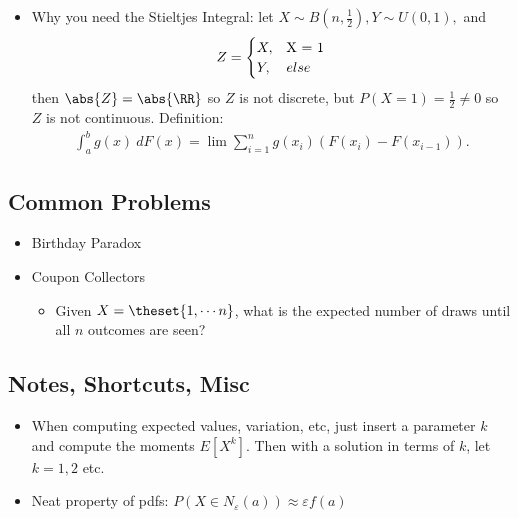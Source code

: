 \begin{itemize}
\tightlist
\item
  Why you need the Stieltjes Integral: let
  \(X \sim B(n, \frac 1 2), Y \sim U(0, 1),\) and
  \begin{align*}
  Z = 
  \begin{cases}
  X, & $X = 1$ \\
  Y, & else
  \end{cases}
  \end{align*} then \(\abs{Z} = \abs{\RR}\) so \(Z\) is not discrete,
  but \(P(X = 1) = \frac 1 2 \neq 0\) so \(Z\) is not continuous.
  Definition:
  \begin{align*}  
  \int _ { a } ^ { b } g ( x ) ~d F ( x ) = \lim \sum _ { i = 1 } ^ { n } g \left( x _ { i } \right) \left( F \left( x _ { i } \right) - F \left( x _ { i - 1 } \right) \right)
  .\end{align*}
\end{itemize}

\hypertarget{common-problems}{%
\subsection{Common Problems}\label{common-problems}}

\begin{itemize}
\tightlist
\item
  Birthday Paradox
\item
  Coupon Collectors

  \begin{itemize}
  \tightlist
  \item
    Given \(X = \theset{1, \cdots n}\), what is the expected number of
    draws until all \(n\) outcomes are seen?
  \end{itemize}
\end{itemize}

\hypertarget{notes-shortcuts-misc}{%
\subsection{Notes, Shortcuts, Misc}\label{notes-shortcuts-misc}}

\begin{itemize}
\tightlist
\item
  When computing expected values, variation, etc, just insert a
  parameter \(k\) and compute the moments \(E[X^k]\). Then with a
  solution in terms of \(k\), let \(k=1,2\) etc.
\item
  Neat property of pdfs:
  \(P(X \in N_\varepsilon(a)) \approx \varepsilon f(a)\)
\end{itemize}

